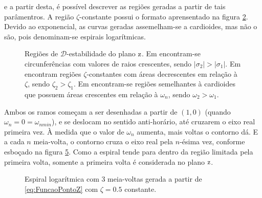 \noindent e a partir desta, é possível descrever as regiões geradas a partir de tais parâmentros. A região $\zeta$-constante possui o formato aprensentado na figura \ref{subfig:MaximoSobressinalZ}. Devido ao exponencial, as curvas geradas assemelham-se a cardioides, mas não o são, pois denominam-se espirais logarítmicas.
\begin{figure}[!ht]
  \centering
  \begin{subfigure}[t]{0.3\columnwidth}
      
      \caption{}
      \label{subfig:EstabilidadeRelativaZ}
  \end{subfigure}
  \begin{subfigure}[t]{0.3\columnwidth}
      
      \caption{}
      \label{subfig:MaximoSobressinalZ}
  \end{subfigure}
  \begin{subfigure}[t]{0.3\columnwidth}
    
    \caption{}
    \label{subfig:OscilacaoNaoAmortecidaZ}
  \end{subfigure}
  \caption{Regiões de $\mathscr{D}$-estabilidade do plano $\operatorname{\mathrm{z}}$. Em  encontram-se circunferências com valores de raios crescentes, sendo $|\sigma_2| > |\sigma_1|$. Em  encontram regiões $\zeta$-constantes com áreas decrescentes em relação à $\zeta$, sendo $\zeta_2 > \zeta_1$. Em  encontram-se regiões semelhantes à cardioides que possuem áreas crescentes em relação à $\omega_n$, sendo $\omega_2 > \omega_1$.}
  \label{fig:RegioesPlanoZ}
\end{figure}

Ambos os ramos começam a ser desenhadas a partir de $(1,0)$ (quando $\omega_n = 0 = \omega_{nmin}$), e se deslocam no sentido anti-horário, até cruzarem o eixo real primeira vez. À medida que o valor de $\omega_n$ aumenta, mais voltas o contorno dá. E a cada $n$ meia-volta, o contorno cruza o eixo real pela $n$-ésima vez, conforme esboçado na figura \ref{fig:EspiralLogaritmica}. Como a espiral tende para dentro da região limitada pela primeira volta, somente a primeira volta é considerada no plano $\operatorname{\mathrm{z}}$.

\begin{figure}[!ht]
  \centering
  
  \caption{Espiral logarítmica com 3 meia-voltas gerada a partir de \eqref{eq:FuncaoPontoZ} com $\zeta=0.5$ constante.}
  \label{fig:EspiralLogaritmica}
\end{figure}

